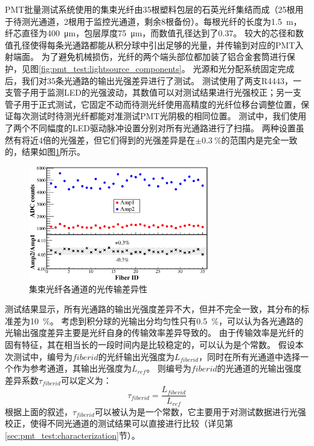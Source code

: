 PMT批量测试系统使用的集束光纤由35根塑料包层的石英光纤\cite{optical_fibre}集结而成（25根用于待测光通道，2根用于监控光通道，剩余8根备份）。每根光纤的长度为\SI{1.5}{\meter}，纤芯直径为\SI{400}{\micro\meter}，包层厚度\SI{75}{\micro\meter}，而数值孔径达到了$0.37$。
较大的芯径和数值孔径使得每条光通路都能从积分球中引出足够的光量，并传输到对应的PMT入射端面。
为了避免机械损伤，光纤的两个端头部位都加装了铝合金套筒进行保护，见图\ref{fig:pmt_test:lightsource_components}。
光源和光分配系统固定完成后，我们对35条光通路的输出光强差异进行了测试。
测试使用了两支R4443，一支管子用于监测LED的光强波动，其数值可以对测试结果进行光强校正；另一支管子用于正式测试，它固定不动而待测光纤使用高精度的光纤位移台调整位置，保证每次测试时待测光纤都能对准测试PMT光阴极的相同位置。
测试中，我们使用了两个不同幅度的LED驱动脉冲设置分别对所有光通路进行了扫描。
两种设置虽然有将近4倍的光强差，但它们得到的光强差异是在$\pm \SI{0.3}{\percent}$的范围内是完全一致的，结果如图\ref{fig:pmt_test:fiber_difference}所示。
\begin{figure}[htbp]
	\centering
	\includegraphics[width=0.7\textwidth]{chap/pmt_test/fig/fiber_difference.eps}
	\caption{集束光纤各通道的光传输差异性}
	\label{fig:pmt_test:fiber_difference}
\end{figure}
测试结果显示，所有光通路的输出光强度差异不大，但并不完全一致，其分布的标准差为\SI{10}{\percent}。
考虑到积分球的光输出分均匀性只有\SI{0.5}{\percent}，可以认为各光通路的光输出强度差异主要是光纤自身的传输效率差异导致的。
由于传输效率是光纤的固有特征，其在相当长的一段时间内是比较稳定的，可以认为是个常数。
假设本次测试中，编号为$fiberid$的光纤输出光强度为$L_{fiberid}$，同时在所有光通道中选择一个作为参考通道，其输出光强度为$L_{ref}$。
则编号为$fiberid$的光通道的光输出强度差异系数$\tau_{fiberid}$可以定义为：
\begin{equation}
	\tau_{fiberid} = \frac{L_{fiberid}}{L_{ref}}
	\label{eq:pmt_test:lightoutput_difference}
\end{equation}
根据上面的叙述，$\tau_{fiberid}$可以被认为是一个常数，它主要用于对测试数据进行光强校正，使得不同光通道的测试结果可以直接进行比较（详见第\ref{sec:pmt_test:characterization}节）。

